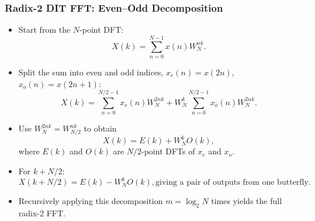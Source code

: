 \begin{frame}
	\frametitle{Radix-2 DIT FFT: Even--Odd Decomposition}
	\begin{itemize}
		\item Start from the $N$-point DFT:
		\begin{equation}
			X(k) = \sum_{n=0}^{N-1} x(n) W_N^{nk}.
		\end{equation}
		\item Split the sum into even and odd indices, $x_e(n)=x(2n)$, $x_o(n)=x(2n+1)$:
		\begin{equation}
			X(k) = \sum_{n=0}^{N/2-1} x_e(n) W_N^{2nk}
					+ W_N^{k} \sum_{n=0}^{N/2-1} x_o(n) W_N^{2nk}.
		\end{equation}
		\item Use $W_N^{2nk} = W_{N/2}^{nk}$ to obtain
		\begin{equation}
			X(k) = E(k) + W_N^{k} O(k),
		\end{equation}
		where $E(k)$ and $O(k)$ are $N/2$-point DFTs of $x_e$ and $x_o$.
		\item For $k+N/2$:
		\begin{equation}
			X(k+N/2) = E(k) - W_N^{k} O(k), \text{giving a pair of outputs from one butterfly.}
		\end{equation}
		\item Recursively applying this decomposition $m=\log_2 N$ times yields the full radix-2 FFT.
	\end{itemize}
\end{frame}

